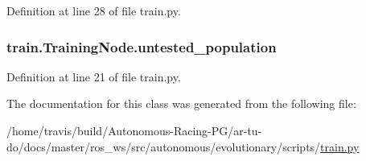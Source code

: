Definition at line 28 of file train.\+py.

\subsubsection[{\texorpdfstring{untested\+\_\+population}{untested_population}}]{\setlength{\rightskip}{0pt plus 5cm}train.\+Training\+Node.\+untested\+\_\+population}\hypertarget{classtrain_1_1_training_node_a6724c3a14d24c6d8d6a4d7e29126627f}{}\label{classtrain_1_1_training_node_a6724c3a14d24c6d8d6a4d7e29126627f}


Definition at line 21 of file train.\+py.



The documentation for this class was generated from the following file\+:\begin{DoxyCompactItemize}
\item 
/home/travis/build/\+Autonomous-\/\+Racing-\/\+P\+G/ar-\/tu-\/do/docs/master/ros\+\_\+ws/src/autonomous/evolutionary/scripts/\hyperlink{train_8py}{train.\+py}\end{DoxyCompactItemize}
